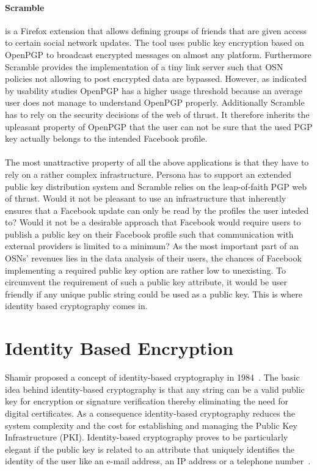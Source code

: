 \documentclass[journal]{IEEEtran}
\begin{document}
\paragraph{Scramble} is a Firefox extension that allows defining groups of
friends that are given access to certain social network updates. The tool uses
public key encryption based on OpenPGP \cite{rfc4880} to broadcast encrypted
messages on almost any platform. Furthermore Scramble provides the
implementation of a tiny link server such that OSN policies not allowing to post
encrypted data are bypassed. However, as indicated by usability studies
\cite{WhittenJohnny} OpenPGP has a higher usage threshold because an average
user does not manage to understand OpenPGP properly. Additionally Scramble has
to rely on the security decisions of the web of thrust. It therefore inherits
the upleasant property of OpenPGP that the user can not be sure that the used
PGP key actually belongs to the intended Facebook profile.\cite{BeatoScramble}\\
\\
The most unattractive property of all the above applications is that they have
to rely on a rather complex infrastructure. Persona has to support an extended
public key distribution system and Scramble relies on the leap-of-faith PGP web
of thrust. Would it not be pleasant to use an infrastructure that inherently
ensures that a Facebook update can only be read by the profiles the user
inteded to? Would it not be a desirable approach that Facebook would require
users to publish a public key on their Facebook profile such that communication
with external providers is limited to a minimum? As the most important part of
an OSNs' revenues lies in the data analysis of their users, the chances of
Facebook implementing a required public key option are rather low to
unexisting. To circumvent the requirement of such a public key attribute, it
would be user friendly if any unique public string could be used as a public
key. This is where identity based cryptography comes in.


\section{Identity Based Encryption}\label{sec:ibe}
Shamir proposed a concept of identity-based cryptography in
1984~\cite{DBLP:conf/crypto/Shamir84}. The basic idea behind identity-based
cryptography is that any string can be a valid public key for encryption or
signature verification thereby eliminating the need for digital certificates.
As a consequence identity-based cryptography reduces the system
complexity and the cost for establishing and managing the Public
Key Infrastructure (PKI). Identity-based cryptography proves to be particularly
elegant if the public key is related to an attribute that uniquely identifies
the identity of the user like an e-mail address, an IP address or a telephone
number~\cite{Baek04asurvey}.
\end{document}
